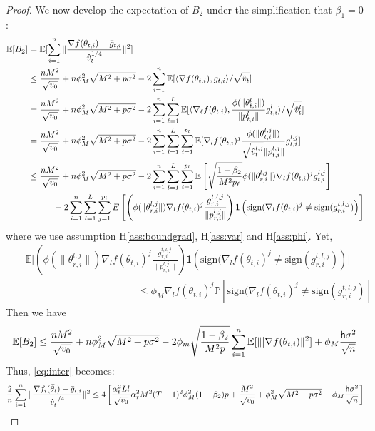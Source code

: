 \documentclass[11pt]{article}
\def\E{\mathbb{E}}
\def\tot{\mathsf{h}}
\newcommand{\sign}{\text{sign}}
\begin{document}
\begin{proof}
\newpage


We now develop the expectation of $B_2$ under the simplification that $\beta_1 = 0$:
\begin{align}\notag
    \mathbb E[B_2]&=\mathbb E[\sum_{i=1}^n\Vert \frac{\nabla f(\theta_{t,i})-\bar g_{t,i}}{\hat v_t^{1/4}} \Vert^2] \\\notag
    &\leq \frac{nM^2}{\sqrt{v_0}}+n\phi_M^2\sqrt{M^2+p\sigma^2}-2\sum_{i=1}^n\mathbb E[\langle \nabla f(\theta_{t,i}),\bar g_{t,i} \rangle/\sqrt{\hat v_t}]\\\notag
    &=\frac{nM^2}{\sqrt{v_0}}+n\phi_M^2\sqrt{M^2+p\sigma^2}-2\sum_{i=1}^n \sum_{\ell=1}^L \mathbb E[\langle \nabla_\ell f(\theta_{t,i}),\frac{\phi(\|\theta_{t,i}^l \|)}{\| p_{t,i}^l \|}g_{t,i}^l \rangle/\sqrt{\hat v_t^l}]\\\notag
    &=\frac{nM^2}{\sqrt{v_0}}+n\phi_M^2\sqrt{M^2+p\sigma^2}-2\sum_{i=1}^n \sum_{l=1}^L\sum_{i=1}^{p_l} \mathbb E[\nabla_l f(\theta_{t,i})^j\frac{\phi(\|\theta_{t,i}^{l,j} \|)}{\sqrt{\hat v_t^{l,j}}\| p_{t,i}^{l,j} \|}g_{t,i}^{l,j} ]\\\notag
    & \leq \frac{nM^2}{\sqrt{v_0}}+n\phi_M^2\sqrt{M^2+p\sigma^2}-2\sum_{i=1}^n \sum_{l=1}^L\sum_{i=1}^{p_l} \mathbb E \left[ \sqrt{\frac{1-\beta_2}{M^2 p_\ell}}  \phi(\|\theta_{r,i}^{l,j}\|)  \nabla_l f(\theta_{t,i})^j  g_{t,i}^{l,j}\right]\\\notag
    &\hspace{0.4in} -2 \sum_{i = 1}^n \sum_{l=1}^L\sum_{j=1}^{p_l}  E \left[  \left( \phi(\|\theta_{r,i}^{l,j}\|)   \nabla_l f(\theta_{t,i})^j   \frac{g_{r,i}^{t,l,j}}{ \|p_{r,i}^{l,j}\|}\right)\mathsf{1}\left( \sign(  \nabla_l f(\theta_{t,i})^j \neq  \sign( g_{r,i}^{t,l,j}) \right)\right]
\end{align}
where we use assumption H\ref{ass:boundgrad}, H\ref{ass:var} and H\ref{ass:phi}. 
Yet,
\begin{align*}
&- \mathbb E \Bigg[  \left( \phi(\|\theta_{r,i}^{l,j}\|)   \nabla_l f(\theta_{t,i})^j   \frac{g_{r,i}^{t,l,j}}{ \|p_{r,i}^{l,j}\|}\right)\mathsf{1}\left( \sign(  \nabla_l f(\theta_{t,i})^j
\neq  \sign( g_{r,i}^{t,l,j}) \right)\Bigg] \\
&\hspace{2in} \leq  \phi_M \nabla_l f(\theta_{t,i})^j   \mathbb{P}\left[  \sign(  \nabla_l f(\theta_{t,i})^j \neq  \sign( g_{r,i}^{t,l,j}) \right]
\end{align*}
Then we have
\begin{align}\notag
    \mathbb E[B_2]\leq  \frac{nM^2}{\sqrt{v_0}}+n\phi_M^2\sqrt{M^2+p\sigma^2}-2 \phi_m \sqrt{\frac{1-\beta_2}{M^2 p}} \sum_{i=1}^n \E[\| [\nabla f(\theta_{t,i}) \|^2] + \phi_M \frac{\tot \sigma^2}{\sqrt{n}}
\end{align}
Thus, \eqref{eq:inter} becomes:
\begin{align}\notag
    \frac{2}{n}\sum_{i=1}^n\Vert \frac{\nabla f_i(\bar\theta_t)-\bar g_{t,i}}{\hat v_t^{1/4}} \Vert^2 \leq 4 \left[ \frac{\alpha_t^2 Ll}{\sqrt{v_0}} \alpha_r^2 M^2 (T-1)^2 \phi_M^2 (1-\beta_2)p + \frac{M^2}{\sqrt{v_0}}+\phi_M^2\sqrt{M^2+p\sigma^2} + \phi_M \frac{\tot \sigma^2}{\sqrt{n}}\right]
\end{align}


\end{proof}
\end{document}
